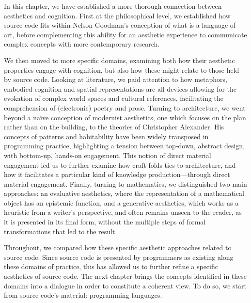 \spacer

In this chapter, we have established a more thorough connection between aesthetics and cognition. First at the philosophical level, we established how source code fits within Nelson Goodman's conception of what is a language of art, before complementing this ability for an aesthetic experience to communicate complex concepts with more contemporary research.

We then moved to more specific domains, examining both how their aesthetic properties engage with cognition, but also how these might relate to those held by source code. Looking at literature, we paid attention to how metaphors, embodied cognition and spatial representations are all devices allowing for the evokation of complex world spaces and cultural references, facilitating the comprehension of (electronic) poetry and prose. Turning to architecture, we went beyond a naïve conception of modernist aesthetics, one which focuses on the plan rather than on the building, to the theories of Christopher Alexander. His concepts of patterns and habitability have been widely transposed in programming practice, highlighting a tension between top-down, abstract design, with bottom-up, hands-on engagement. This notion of direct material engagement led us to further examine how craft folds ties to architecture, and how it facilitates a particular kind of knowledge production—through direct material engagement. Finally, turning to mathematics, we distinguished two main approaches: an evaluative aesthetics, where the representation of a mathematical object has an epistemic function, and a generative aesthetics, which works as a heuristic from a writer's perspective, and often remains unseen to the reader, as it is presented in its final form, without the multiple steps of formal transformations that led to the result.

Throughout, we compared how these specific aesthetic approaches related to source code. Since source code is presented by programmers as existing along these domains of practice, this has allowed us to further refine a specific aesthetics of source code. The next chapter brings the concepts identified in these domains into a dialogue in order to constitute a coherent view. To do so, we start from source code's material: programming languages.

